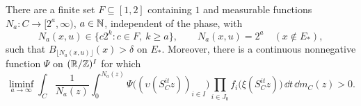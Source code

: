 \begin{lemma}\label{lem:selected-witness}
There are a finite set $F\subseteq[1,2]$ containing $1$ and measurable
functions $N_a:C\to[2^a,\infty)$, $a\in\mathbb N$, independent of the phase,
with
\begin{equation}\label{eq:selector-grid}
  N_a(x,u)\in\{c2^k:c\in F,\ k\ge a\},\qquad
  N_a(x,u)=2^a\quad(x\notin E_*),
\end{equation}
such that $B_{\lfloor N_a(x,u)\rfloor}(x)>\delta$ on $E_*$.
Moreover, there is a continuous nonnegative function $\Psi$ on
$(\mathbb R/\mathbb Z)^I$ for which
\begin{equation}\label{eq:selected-positive-limit}
 \liminf_{a\to\infty}\int_C\frac1{N_a(z)}
 \int_0^{N_a(z)}
 \Psi\bigl((\upsilon(S_C^{it}z))_{i\in I}\bigr)
 \prod_{i\in J_0}f_i\bigl(\xi(S_C^{it}z)\bigr)
 \,\dd t\,\dd m_C(z)>0.
\end{equation}
\end{lemma}

